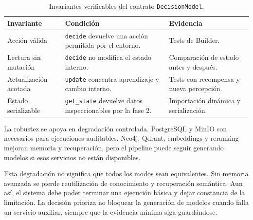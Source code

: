 \begin{table}[H]
\begin{center}
\small
\begin{tabular}{|p{3.1cm}|p{5.3cm}|p{4.1cm}|} \hline
\textbf{Invariante} & \textbf{Condición} & \textbf{Evidencia} \\ \hline
Acción válida & \texttt{decide} devuelve una acción permitida por el entorno. & Tests de Builder. \\ \hline
Lectura sin mutación & \texttt{decide} no modifica el estado interno. & Comparación de estado antes y después. \\ \hline
Actualización acotada & \texttt{update} concentra aprendizaje y cambio interno. & Tests con recompensa y nueva percepción. \\ \hline
Estado serializable & \texttt{get\_state} devuelve datos inspeccionables por la fase 2. & Importación dinámica y serialización. \\ \hline
\end{tabular}
\caption{Invariantes verificables del contrato \texttt{DecisionModel}.}
\end{center}
\end{table}

La robustez se apoya en degradación controlada. PostgreSQL y MinIO son
necesarios para ejecuciones auditables. Neo4j, Qdrant, embeddings y reranking
mejoran memoria y recuperación, pero el pipeline puede seguir generando modelos
si esos servicios no están disponibles.

Esta degradación no significa que todos los modos sean equivalentes. Sin memoria
avanzada se pierde reutilización de conocimiento y recuperación semántica. Aun
así, el sistema debe poder terminar una ejecución básica y dejar constancia de
la limitación. La decisión prioriza no bloquear la generación de modelos cuando
falla un servicio auxiliar, siempre que la evidencia mínima siga guardándose.
